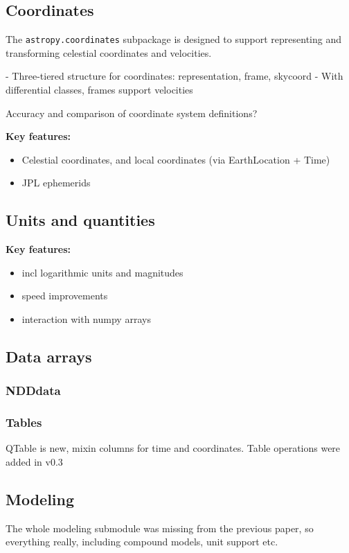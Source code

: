 \documentclass[modern]{aastex61}
\begin{document}
\subsection{Coordinates}

The \texttt{astropy.coordinates} subpackage is designed to support representing
and transforming celestial coordinates and velocities.


- Three-tiered structure for coordinates: representation, frame, skycoord
- With differential classes, frames support velocities

Accuracy and comparison of coordinate system definitions?

\textbf{Key features:}
\begin{itemize}
	\item Celestial coordinates, and local coordinates (via EarthLocation + Time)
	\item JPL ephemerids
\end{itemize}

\subsection{Units and quantities}

\textbf{Key features:}
\begin{itemize}
	\item incl logarithmic units and magnitudes
	\item speed improvements
    \item interaction with numpy arrays
\end{itemize}

\subsection{Data arrays}

\subsubsection{NDDdata}

\subsubsection{Tables}
QTable is new, mixin columns for time and coordinates. Table operations were added in v0.3




\subsection{Modeling}
The whole modeling submodule was missing from the previous paper, so everything really, including compound models, unit support etc.
\end{document}
